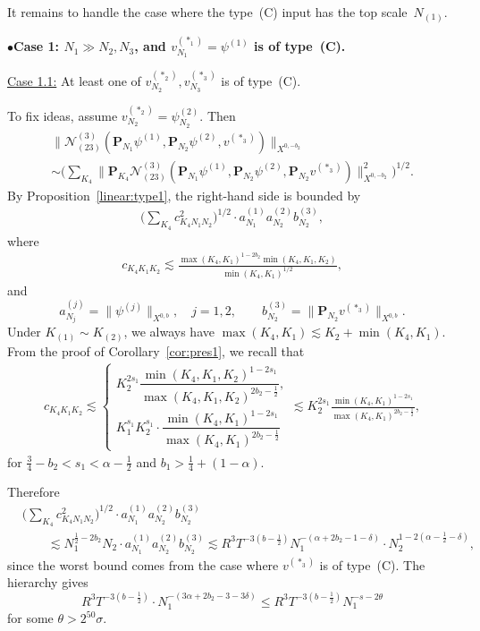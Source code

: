 \documentclass[11pt,reqno,english]{amsart}
\numberwithin{equation}{section}
\theoremstyle{plain}
\theoremstyle{definition}
\theoremstyle{remark}
\newcommand{\noi}{\noindent}
\begin{document}
It remains to handle the case where the type~(C) input has the top scale~$N_{(1)}$.

\noi
$\bullet${\bf Case 1: $N_1\gg N_2, N_3$, and $v_{N_1}^{(\ast_1)}=\psi^{(1)}$ is of type~(C).}

\underline{Case 1.1:}
At least one of $v_{N_2}^{(\ast_2)},v_{N_3}^{(\ast_3)}$ is of type~(C).

To fix ideas, assume $v_{N_2}^{(\ast_2)}=\psi_{N_2}^{(2)}$. Then
\begin{multline*}
	\|\mathcal{N}_{(23)}^{(3)}(\mathbf{P}_{N_1}\psi^{(1)},\mathbf{P}_{N_2}\psi^{(2)},v^{(\ast_3)})\|_{X^{0,-b_2}}\\
	\sim \Big(
	\sum_{K_4}\big\|\mathbf{P}_{K_4}\mathcal{N}_{(23)}^{(3)}(\mathbf{P}_{N_1}\psi^{(1)},\mathbf{P}_{N_2}\psi^{(2)},\mathbf{P}_{N_2}v^{(\ast_3)})\big\|_{X^{0,-b_2}}^2
	\Big)^{1/2}.
\end{multline*}
By Proposition~\ref{linear:type1}, the right-hand side is bounded by
\begin{align*}
	\Big(\sum_{K_4}
	c_{K_4 N_1 N_2}^2
	\Big)^{1/2}\cdot a^{(1)}_{N_1} a_{N_2}^{(2)} b_{N_2}^{(3)},
\end{align*}
where
\begin{align}\label{cK4K1K2}
	c_{K_4 K_1 K_2}\lesssim
	\frac{\max(K_4,K_1)^{1-2b_2}
		\min(K_4,K_1,K_2)
	}{\min(K_4,K_1)^{1/2}},
\end{align}
and
\[
a_{N_j}^{(j)}=\|\psi^{(j)}\|_{X^{0,b}},\quad j=1,2,\qquad b_{N_2}^{(3)}=\|\mathbf{P}_{N_2}v^{(\ast_3)}\|_{X^{0,b}}.
\]
Under $K_{(1)}\sim K_{(2)}$, we always have $\max(K_4,K_1)\lesssim K_2+\min(K_4,K_1)$.
From the proof of Corollary~\ref{cor:pres1}, we recall that
\begin{align}\label{controlcK4K1K2}
	c_{K_4 K_1 K_2}\lesssim \begin{cases}
		K_2^{2s_1}\dfrac{\min(K_4,K_1,K_2)^{1-2s_1}}{\max(K_4,K_1,K_2)^{2b_2-\frac{1}{2}}},\\[6pt]
		K_1^{s_1}K_2^{s_1}\cdot \dfrac{\min(K_4,K_1)^{1-2s_1}}{\max(K_4,K_1)^{2b_2-\frac{1}{2}}}
	\end{cases}
	\lesssim K_2^{2s_1}\frac{\min(K_4,K_1)^{1-2s_1}}{\max(K_4,K_1)^{2b_2-\frac{1}{2}}},
\end{align}
for $\frac{3}{4}-b_2<s_1<\alpha-\frac{1}{2}$ and $b_1>\frac{1}{4}+(1-\alpha)$.

Therefore
\begin{align*}
	&\Big(\sum_{K_4}
	c_{K_4 N_1 N_2}^2
	\Big)^{1/2}\cdot a^{(1)}_{N_1} a_{N_2}^{(2)} b_{N_2}^{(3)}\\
	&\qquad\lesssim N_1^{\frac{1}{2}-2b_2}N_2\cdot a_{N_1}^{(1)}a_{N_2}^{(2)}b_{N_2}^{(3)}\lesssim R^3 T^{-3(b-\frac{1}{2})}N_1^{-(\alpha+2b_2-1-\delta)}\cdot N_2^{1-2(\alpha-\frac{1}{2}-\delta)},
\end{align*}
since the worst bound comes from the case where $v^{(\ast_3)}$ is of type~(C).
The hierarchy gives
\[
R^3 T^{-3(b-\frac{1}{2})}\cdot N_1^{-(3\alpha+2b_2-3-3\delta)}\leq R^3 T^{-3(b-\frac{1}{2})}N_1^{-s-2\theta}
\]
for some $\theta>2^{50}\sigma$.
\end{document}
